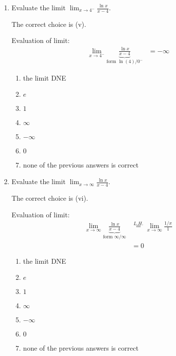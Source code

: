 \documentclass[nooutcomes]{ximera}
\begin{document}
\begin{problem}
\begin{enumerate}
    \item
      Evaluate the limit $\lim_{x \to 4^-} \frac{\ln x}{x - 4}$.
      \begin{freeResponse}
        The correct choice is (v).

        Evaluation of limit:
        \begin{align*}
          \lim_{x \to 4^-} \underbrace{\frac{\ln x}{x - 4}}_{\text{form $\ln(4)/0^-$}} &= - \infty
        \end{align*}
      \end{freeResponse}

      \begin{enumerate}
        \item
          the limit DNE
        \item
          $e$
        \item
          $1$
        \item
          $\infty$
        \item
          $-\infty$
        \item
          $0$
        \item
          none of the previous answers is correct
      \end{enumerate}

    \item
      Evaluate the limit $\lim_{x \to \infty} \frac{\ln x}{x - 4}$.
      \begin{freeResponse}
        The correct choice is (vi).

        Evaluation of limit:
        \begin{align*}
          \lim_{x \to \infty} \underbrace{\frac{\ln x}{x - 4}}_{\text{form $\infty/\infty$}} &\stackrel{L.H.}{=} \lim_{x \to \infty} \frac{1/x}{1} \\
          &= 0
        \end{align*}

      \end{freeResponse}

      \begin{enumerate}
        \item
          the limit DNE
        \item
          $e$
        \item
          $1$
        \item
          $\infty$
        \item
          $-\infty$
        \item
          $0$
        \item
          none of the previous answers is correct
      \end{enumerate}


\end{enumerate}
\end{problem}
\end{document}
